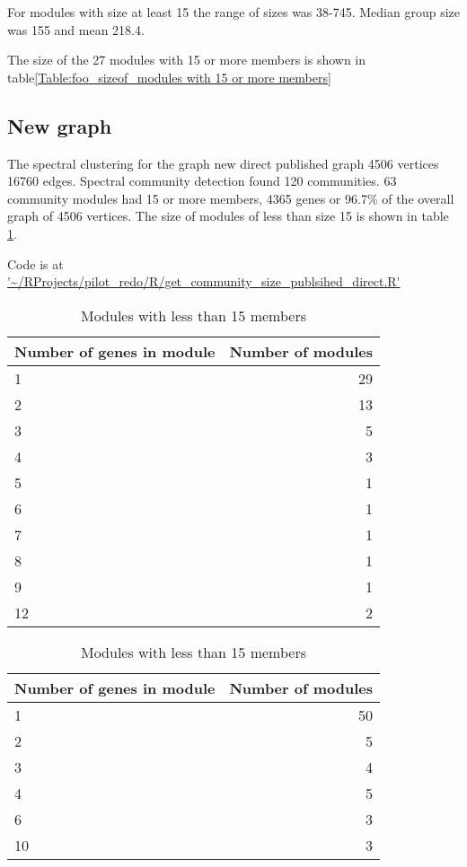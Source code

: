 For modules with size at least 15 the range of sizes was 38-745. Median group size was 155 and mean 218.4.

The size of the 27 modules with 15 or more members is shown in table\ref{Table:foo_sizeof_modules with 15 or more members}

\subsection{New graph}
The spectral clustering for the graph new direct published graph 4506 vertices 16760 edges. Spectral community detection found 120 communities. 63 community modules had 15 or more members, 4365 genes or 96.7\% of the overall graph of 4506 vertices. The size of modules of less than size 15 is shown in table \ref{Table:direct Count of modules with less than 15 members}.



Code is at \url{'~/RProjects/pilot_redo/R/get_community_size_publsihed_direct.R'}

\begin{table}[ht]
\centering
\begin{tabular}{lr}
  \hline
Number of genes in module & Number of modules \\ 
  \hline
1 &  29 \\ 
  2 &  13 \\ 
  3 &   5 \\ 
  4 &   3 \\ 
  5 &   1 \\ 
  6 &   1 \\ 
  7 &   1 \\ 
  8 &   1 \\ 
  9 &   1 \\ 
  12 &   2 \\ 
   \hline
\end{tabular}
\caption{Modules with less than 15 members} 
\label{Table:direct Count of modules with less than 15 members}
\end{table}
\begin{table}[ht]
\centering
\begin{tabular}{lr}
  \hline
Number of genes in module & Number of modules \\ 
  \hline
1 &  50 \\ 
  2 &   5 \\ 
  3 &   4 \\ 
  4 &   5 \\ 
  6 &   3 \\ 
  10 &   3 \\ 
   \hline
\end{tabular}
\caption{Modules with less than 15 members} 
\label{Table:Foo_modules_with_lessthan_15}
\end{table}

